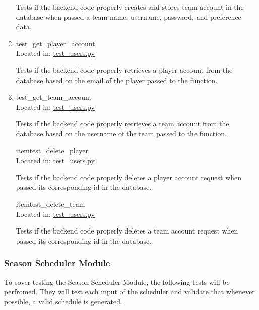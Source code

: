 \documentclass[12pt, titlepage]{article}
\begin{document}
\begin{enumerate}
  Tests if the backend code properly creates and stores team account in the database 
  when passed a team name, username, password, and preference data.

  \item{test\_get\_player\_account\\}
  Located in: \href{https://github.com/Nicholas-Fabugais-Inaba/Sandlot/blob/pytest-workflow/test/test_users.py}{test\_users.py}
  
  Tests if the backend code properly retrieves a player account from the database 
  based on the email of the player passed to the function.

  \item{test\_get\_team\_account\\}
  Located in: \href{https://github.com/Nicholas-Fabugais-Inaba/Sandlot/blob/pytest-workflow/test/test_users.py}{test\_users.py}
  
  Tests if the backend code properly retrieves a team account from the database 
  based on the username of the team passed to the function.

  item{test\_delete\_player\\}
  Located in: \href{https://github.com/Nicholas-Fabugais-Inaba/Sandlot/blob/pytest-workflow/test/test_users.py}{test\_users.py}
  
  Tests if the backend code properly deletes a player account request when passed its 
  corresponding id in the database.

  item{test\_delete\_team\\}
  Located in: \href{https://github.com/Nicholas-Fabugais-Inaba/Sandlot/blob/pytest-workflow/test/test_users.py}{test\_users.py}
  
  Tests if the backend code properly deletes a team account request when passed its 
  corresponding id in the database.


\end{enumerate}

\subsubsection{Season Scheduler Module}

To cover testing the Season Scheduler Module, the following tests will be
perfromed. They will test each input of the scheduler and validate that
whenever possible, a valid schedule is generated.
\end{document}
